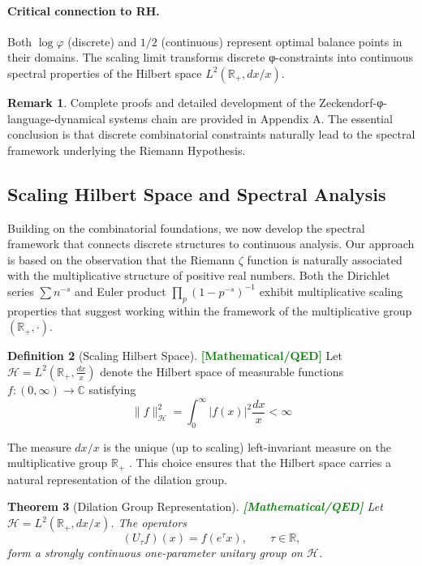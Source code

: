 \documentclass[12pt]{article}
\theoremstyle{plain}
\newtheorem{theorem}{Theorem}[section]
\theoremstyle{definition}
\newtheorem{definition}[theorem]{Definition}
\newtheorem{remark}[theorem]{Remark}
\newcommand{\statusmath}{\textcolor{green}{\textbf{[Mathematical/QED]}}}
\begin{document}
\paragraph{Critical connection to RH.} Both $\log \varphi$ (discrete) and $1/2$ (continuous) represent optimal balance points in their domains. The scaling limit transforms discrete φ-constraints into continuous spectral properties of the Hilbert space $L^2(\mathbb{R}_+, dx/x)$.

\begin{remark}
Complete proofs and detailed development of the Zeckendorf-φ-language-dynamical systems chain are provided in Appendix A. The essential conclusion is that discrete combinatorial constraints naturally lead to the spectral framework underlying the Riemann Hypothesis.
\end{remark}

\subsection{Scaling Hilbert Space and Spectral Analysis}

Building on the combinatorial foundations, we now develop the spectral framework that connects discrete structures to continuous analysis. Our approach is based on the observation that the Riemann $\zeta$ function is naturally associated with the multiplicative structure of positive real numbers. Both the Dirichlet series $\sum n^{-s}$ and Euler product $\prod_p (1-p^{-s})^{-1}$ exhibit multiplicative scaling properties that suggest working within the framework of the multiplicative group $(\mathbb{R}_+, \cdot)$.

\begin{definition}[Scaling Hilbert Space] \statusmath
Let $\mathcal{H} = L^2(\mathbb{R}_+, \frac{dx}{x})$ denote the Hilbert space of measurable functions $f: (0,\infty) \to \mathbb{C}$ satisfying
$$
\|f\|_{\mathcal{H}}^2 = \int_0^\infty |f(x)|^2 \frac{dx}{x} < \infty
$$
\end{definition}

The measure $dx/x$ is the unique (up to scaling) left-invariant measure on the multiplicative group $\mathbb{R}_+$ \cite{walters1982,cornfeld1982}. This choice ensures that the Hilbert space carries a natural representation of the dilation group.

\begin{theorem}[Dilation Group Representation] \statusmath
Let $\mathcal{H}=L^2(\mathbb{R}_+,dx/x)$. The operators
$$
(U_\tau f)(x)=f(e^\tau x),\qquad \tau\in\mathbb{R},
$$
form a strongly continuous one-parameter \emph{unitary} group on $\mathcal{H}$.
\end{theorem}
\end{document}

